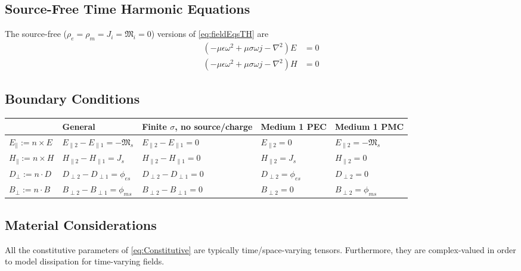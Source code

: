 \documentclass{article}
\numberwithin{equation}{section}
\begin{document}
\subsection{Source-Free Time Harmonic Equations}
The source-free ($\rho_e = \rho_m = J_i = \mathfrak{M}_i = 0$) versions of \eqref{eq:fieldEqsTH} are
\begin{subequations} \label{eq:fieldEqsSF}
    \begin{align}
   (- \mu \epsilon \omega^2 + \mu \sigma \omega j - \nabla^2 ) E & = 0 \label{eq:electricFieldEqSF} \\
    ( - \mu \epsilon \omega^2 + \mu \sigma \omega j - \nabla^2 ) H & = 0 \label{eq:magneticFieldEqSF}
    \end{align}
\end{subequations}
\subsection{Boundary Conditions}

\scriptsize
\begin{tabular}{ | m{6.5em} || m{7.9em} | m{7.5em} | m{7.7em} | m{7.9em} | }
    \hline
    & \textbf{General} & \textbf{Finite \( \sigma \), no source/charge} & \textbf{Medium 1 PEC} & \textbf{Medium 1 PMC} \\
    \hline\hline
    \( E_{\parallel} := n \times E \) & \( E_{\parallel 2} - E_{\parallel 1} = -\mathfrak{M}_s \) & \( E_{\parallel 2} - E_{\parallel 1} = 0 \) & \( E_{\parallel 2} = 0 \) & \( E_{\parallel 2} = -\mathfrak{M}_s \) \\
    \( H_{\parallel} := n \times H \) & \( H_{\parallel 2} - H_{\parallel 1} = J_s \) & \( H_{\parallel 2} - H_{\parallel 1} = 0 \) & \( H_{\parallel 2} = J_s \) & \( H_{\parallel 2} = 0 \) \\
    \( D_{\perp} := n \cdot D \) & \( D_{\perp 2} - D_{\perp 1} = \phi_{es} \) & \( D_{\perp 2} - D_{\perp 1} = 0 \) & \( D_{\perp 2} = \phi_{es} \) & \( D_{\perp 2} = 0 \) \\
    \( B_{\perp} := n \cdot B \) & \( B_{\perp 2} - B_{\perp 1} = \phi_{ms} \) & \( B_{\perp 2} - B_{\perp 1} = 0 \) & \( B_{\perp 2} = 0 \) & \( B_{\perp 2} = \phi_{ms} \) \\
    \hline
\end{tabular}
\normalsize
\subsection{Material Considerations}
All the constitutive parameters of \eqref{eq:Constitutive} are typically time/space-varying tensors. Furthermore, they are complex-valued in order to model dissipation for time-varying fields.
\end{document}
